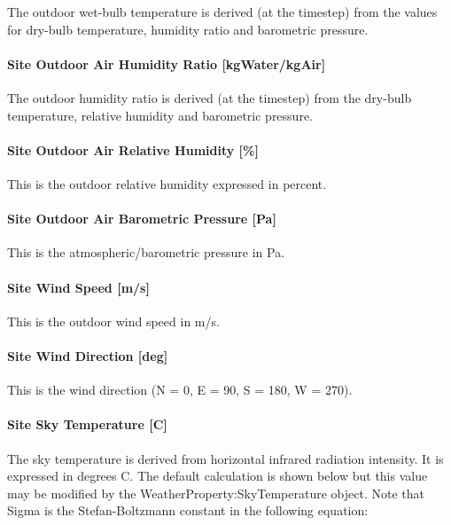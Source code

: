 The outdoor wet-bulb temperature is derived (at the timestep) from the values for dry-bulb temperature, humidity ratio and barometric pressure.

\paragraph{Site Outdoor Air Humidity Ratio {[}kgWater/kgAir{]}}\label{site-outdoor-air-humidity-ratio-kgwaterkgair}

The outdoor humidity ratio is derived (at the timestep) from the dry-bulb temperature, relative humidity and barometric pressure.

\paragraph{Site Outdoor Air Relative Humidity {[}\%{]}}\label{site-outdoor-air-relative-humidity}

This is the outdoor relative humidity expressed in percent.

\paragraph{Site Outdoor Air Barometric Pressure {[}Pa{]}}\label{site-outdoor-air-barometric-pressure-pa}

This is the atmospheric/barometric pressure in Pa.

\paragraph{Site Wind Speed {[}m/s{]}}\label{site-wind-speed-ms}

This is the outdoor wind speed in m/s.

\paragraph{Site Wind Direction {[}deg{]}}\label{site-wind-direction-deg}

This is the wind direction (N = 0, E = 90, S = 180, W = 270).

\paragraph{Site Sky Temperature {[}C{]}}\label{site-sky-temperature-c}

The sky temperature is derived from horizontal infrared radiation intensity. It is expressed in degrees C. The default calculation is shown below but this value may be modified by the WeatherProperty:SkyTemperature object. Note that Sigma is the Stefan-Boltzmann constant in the following equation:

